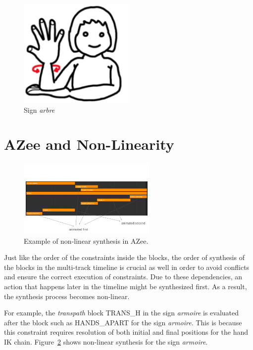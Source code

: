 \documentclass[../../main.tex]{subfiles}
\begin{document}
\begin{figure}[h]
    \centering
    \includegraphics[width=0.5\textwidth]{chapters/multi_track/images/tree.png}
    \caption{Sign \emph{arbre}~\cite{boutetetal}}
    \label{fig:tree_sign}
\end{figure}

\section{AZee and Non-Linearity}
\label{ch:multi_track:azee_nl}

\begin{figure}[H]
    \centering
    \includegraphics[width=0.6\textwidth]{chapters/multi_track/images/example_azee_non_linear.png}
    \caption{Example of non-linear synthesis in AZee.}
    \label{fig:example_azee_non_linear}
\end{figure}

Just like the order of the constraints inside the blocks, the order of synthesis of the blocks in the multi-track timeline is crucial as well in order to avoid conflicts and ensure the correct execution of constraints. Due to these dependencies, an action that happens later in the timeline might be synthesized first. As a result, the synthesis process becomes non-linear.

For example, the \emph{transpath} block TRANS\_H in the sign \emph{armoire} is evaluated after the block such as HANDS\_APART for the sign \emph{armoire}. This is because this constraint requires resolution of both initial and final positions for the hand IK chain. Figure~\ref{fig:example_azee_non_linear} shows non-linear synthesis for the sign \emph{armoire}.
\end{document}
